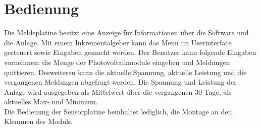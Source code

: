 %
%
%
\section{Bedienung}
Die Meldeplatine besitzt eine Anzeige für Informationen über die Software und die Anlage. Mit einem Inkrementalgeber kann das Menü im Userinterface gesteuert sowie Eingaben gemacht werden. Der Benutzer kann folgende Eingaben vornehmen: die Menge der Photovoltaikmodule eingeben und Meldungen quittieren. Desweiteren kann die aktuelle Spannung, aktuelle Leistung und die vergangenen Meldungen abgefragt werden. Die Spannung und Leistung der Anlage wird ausgegeben als Mittelwert über die vergangenen 30 Tage, als aktuelles Max- und Minimum.
\\
Die Bedienung der Sensorplatine beinhaltet lediglich, die Montage an den Klemmen des Moduls.
%